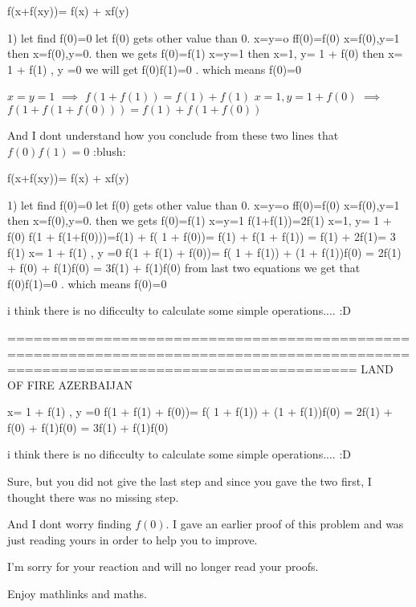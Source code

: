\begin{solution}
	\begin{tcolorbox}f(x+f(xy))= f(x) + xf(y) 

1) let find f(0)=0
let f(0) gets other value than 0. x=y=o  ff(0)=f(0)
x=f(0),y=1 then x=f(0),y=0.  then we gets f(0)=f(1)
x=y=1 then x=1, y= 1 + f(0) then x= 1 + f(1) , y =0    we will get f(0)f(1)=0 . which means f(0)=0
\end{tcolorbox}

$ x = y = 1$ $ \implies$ $ f(1 + f(1)) = f(1) + f(1)$
$ x = 1, y = 1 + f(0)$ $ \implies$ $ f(1 + f(1 + f(0))) = f(1) + f(1 + f(0))$

And I dont understand how you conclude from these two lines that $ f(0)f(1) = 0$
 :blush:
\end{solution}



\begin{solution}
	f(x+f(xy))= f(x) + xf(y) 

1) let find f(0)=0 
let f(0) gets other value than 0. x=y=o ff(0)=f(0) 
x=f(0),y=1 then x=f(0),y=0. then we gets f(0)=f(1) 
x=y=1                   f(1+f(1))=2f(1)
x=1, y= 1 + f(0)     f(1 + f(1+f(0)))=f(1) + f( 1 + f(0))= f(1) + f(1 + f(1)) = f(1) + 2f(1)= 3 f(1)
x= 1 + f(1) , y =0   f(1 + f(1) + f(0))= f( 1 + f(1)) + (1 + f(1))f(0) = 2f(1) + f(0) + f(1)f(0) = 3f(1) + f(1)f(0)
from last two equations we get that  f(0)f(1)=0 . which means f(0)=0

i think there is no dificculty to calculate some simple operations.... :D 

====================================================================================================================================
LAND OF FIRE AZERBAIJAN
\end{solution}



\begin{solution}
	\begin{tcolorbox} x= 1 + f(1) , y =0   f(1 + f(1) + f(0))= f( 1 + f(1)) + (1 + f(1))f(0) = 2f(1) + f(0) + f(1)f(0) = 3f(1) + f(1)f(0)

i think there is no dificculty to calculate some simple operations.... :D 
\end{tcolorbox}

Sure, but you did not give the last step and since you gave the two first, I thought there was no missing step.

And I dont worry finding $ f(0)$. I gave an earlier proof of this problem and was just reading yours in order to help you to improve.

I'm sorry for your reaction and will no longer read your proofs.

Enjoy mathlinks and maths.
\end{solution}



